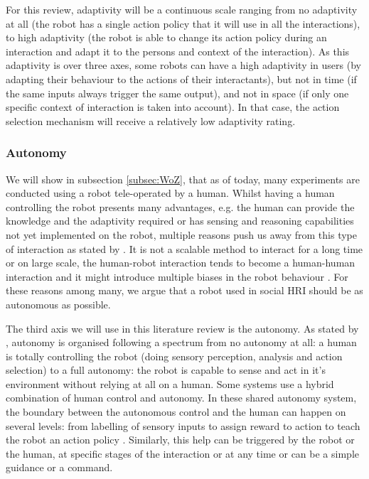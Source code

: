     For this review, adaptivity will be a continuous scale ranging from no
    adaptivity at all (the robot has a single action policy that it will use in
    all the interactions), to high adaptivity (the robot is able to change its
    action policy during an interaction and adapt it to the persons and context
    of the interaction). As this adaptivity is over three axes, some robots can
    have a high adaptivity in users (by adapting their behaviour to the actions
    of their interactants), but not in time (if the same inputs always trigger
    the same output), and not in space (if only one specific context of
    interaction is taken into account). In that case, the action selection
    mechanism will receive a relatively low adaptivity rating.

\subsubsection{Autonomy}
	
    We will show in subsection \ref{subsec:WoZ}, that as of today, many
    experiments are conducted using a robot tele-operated by a human. Whilst
    having a human controlling the robot presents many advantages, e.g. the
    human can provide the knowledge and the adaptivity required or has sensing
    and reasoning capabilities not yet implemented on the robot, multiple
    reasons push us away from this type of interaction as stated by
    \citet{Thill2013}. It is not a scalable method to interact for a long time
    or on large scale, the human-robot interaction tends to become a human-human
    interaction \citep{baxter2016characterising} and it might introduce multiple
    biases in the robot behaviour \citep{howley2014effects}. For these reasons
    among many, we argue that a robot used in social HRI should be as autonomous
    as possible.
	
    The third axis we will use in this literature review is the autonomy. As
    stated by 	 \citet{beer2014toward}, autonomy is organised following a
    spectrum from no autonomy at all: a human is totally controlling the robot
    (doing sensory perception, analysis and action selection) to a full
    autonomy: the robot is capable to sense and act in it's environment without
    relying at all on a human. Some systems use a hybrid combination of human
    control and autonomy. In these shared autonomy system, the boundary between
    the autonomous control and the human can happen on several levels: from
    labelling of sensory inputs \citep{depalma2016nimbus} to assign reward to
    action to teach the robot an action policy \citep{thomaz2008teachable}.
    Similarly, this help can be triggered by the robot or the human, at specific
    stages of the interaction or at any time or can be a simple guidance or a
    command. 

